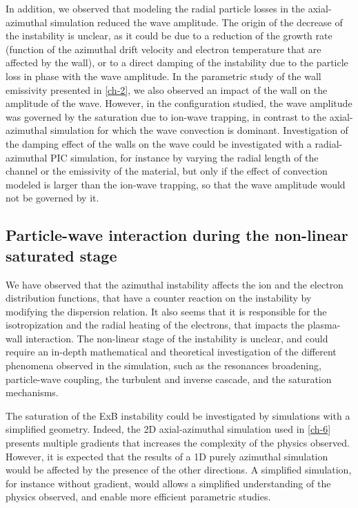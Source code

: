     In addition, we observed that modeling the radial particle losses in the axial-azimuthal simulation reduced the wave amplitude.
    The origin of the decrease of the instability is unclear, as it could be due to a reduction of the growth rate (function of the azimuthal drift velocity and electron temperature that are affected by the wall), or to a direct damping of the instability due to the particle loss in phase with the wave amplitude.
    In the parametric study of the wall emissivity presented in \cref{ch-2}, we also observed an impact of the wall on the amplitude of the wave.
    However, in the configuration studied, the  wave amplitude was governed by the saturation due to ion-wave trapping, in contrast to the axial-azimuthal simulation for which the wave convection is dominant.
    Investigation of the damping effect of the walls on the wave could be investigated with a radial-azimuthal PIC simulation, for instance by varying the radial length of the channel or the emissivity of the material, but only if the effect of convection modeled is larger than the ion-wave trapping, so that the wave amplitude would not be governed by it.

  \subsection{Particle-wave interaction during the non-linear saturated stage}
    We have observed that the azimuthal instability affects the ion and the electron distribution functions, that have a counter reaction on the instability by modifying the dispersion relation.
    It also seems that it is responsible for the isotropization  and the radial heating of the electrons, that impacts the plasma-wall interaction.
    The non-linear stage of the instability is unclear, and could require an in-depth mathematical and theoretical investigation of the different phenomena observed in the simulation, such as the resonances broadening, particle-wave coupling, the turbulent and inverse cascade, and the saturation mechanisms.

    The saturation of the ExB instability could be investigated by simulations with a simplified geometry.
    Indeed, the 2D axial-azimuthal simulation used in \cref{ch-6} presents multiple gradients that increases the complexity of the physics observed.
    However, it is expected that the results of a 1D purely azimuthal simulation would be affected by the presence of the other directions.
    A simplified simulation, for instance without gradient, would allows a simplified understanding of the physics observed, and enable more efficient parametric studies.


